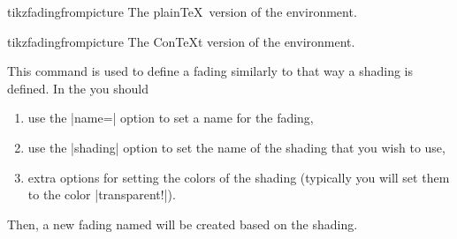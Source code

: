 \begin{plainenvironment}{{tikzfadingfrompicture}}
  The plain\TeX\ version of the environment.
\end{plainenvironment}

\begin{contextenvironment}{{tikzfadingfrompicture}}
  The Con\TeX t version of the environment.
\end{contextenvironment}

\begin{command}{\tikzfading{}}
  This command is used to define a fading similarly to that way a
  shading is defined. In the  you should 
  \begin{enumerate}
  \item use the |name=| option to set a name for the fading,
  \item use the |shading| option to set the name of the shading that
    you wish to use,
  \item extra options for setting the colors of the shading (typically
    you will set them to the color |transparent!|).
  \end{enumerate}
  Then, a new fading named  will be created based on the
  shading.

\begin{codeexample}[]
\tikzfading[name=fade right,
            left color=transparent!0,
            right color=transparent!100]

\end{codeexample}  

\begin{codeexample}[]
\tikzfading[name=fade out,
            inner color=transparent!0,
            outer color=transparent!100]

\end{codeexample}  
\end{command}



